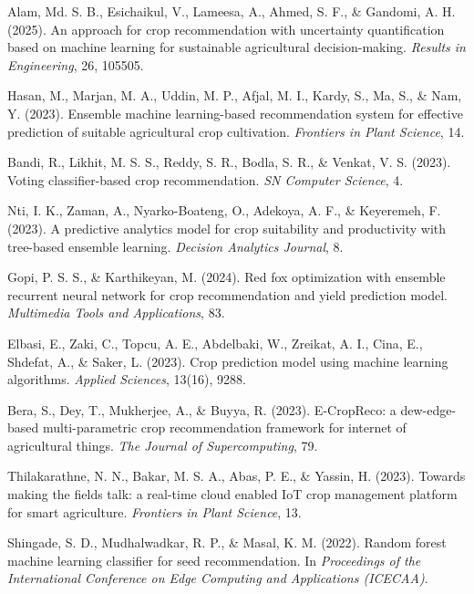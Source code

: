 \documentclass[12pt,a4paper,twocolumn]{article}
\begin{document}
\begin{enumerate}[label={[\arabic*]}, leftmargin=*, itemsep=4pt]
\item Alam, Md. S. B., Esichaikul, V., Lameesa, A., Ahmed, S. F., \& Gandomi, A. H.
(2025). An approach for crop recommendation with uncertainty quantification based on
machine learning for sustainable agricultural decision-making. \emph{Results in
Engineering}, 26, 105505.

\item Hasan, M., Marjan, M. A., Uddin, M. P., Afjal, M. I., Kardy, S., Ma, S., \&
Nam, Y. (2023). Ensemble machine learning-based recommendation system for effective
prediction of suitable agricultural crop cultivation. \emph{Frontiers in Plant
Science}, 14.

\item Bandi, R., Likhit, M. S. S., Reddy, S. R., Bodla, S. R., \& Venkat, V. S.
(2023). Voting classifier-based crop recommendation. \emph{SN Computer Science}, 4.

\item Nti, I. K., Zaman, A., Nyarko-Boateng, O., Adekoya, A. F., \& Keyeremeh, F.
(2023). A predictive analytics model for crop suitability and productivity with
tree-based ensemble learning. \emph{Decision Analytics Journal}, 8.

\item Gopi, P. S. S., \& Karthikeyan, M. (2024). Red fox optimization with ensemble
recurrent neural network for crop recommendation and yield prediction model.
\emph{Multimedia Tools and Applications}, 83.

\item Elbasi, E., Zaki, C., Topcu, A. E., Abdelbaki, W., Zreikat, A. I., Cina, E.,
Shdefat, A., \& Saker, L. (2023). Crop prediction model using machine learning
algorithms. \emph{Applied Sciences}, 13(16), 9288.

\item Bera, S., Dey, T., Mukherjee, A., \& Buyya, R. (2023). E-CropReco: a
dew-edge-based multi-parametric crop recommendation framework for internet of
agricultural things. \emph{The Journal of Supercomputing}, 79.

\item Thilakarathne, N. N., Bakar, M. S. A., Abas, P. E., \& Yassin, H. (2023).
Towards making the fields talk: a real-time cloud enabled IoT crop management
platform for smart agriculture. \emph{Frontiers in Plant Science}, 13.

\item Shingade, S. D., Mudhalwadkar, R. P., \& Masal, K. M. (2022). Random forest
machine learning classifier for seed recommendation. In \emph{Proceedings of the
International Conference on Edge Computing and Applications (ICECAA)}.


\end{enumerate}
\end{document}
